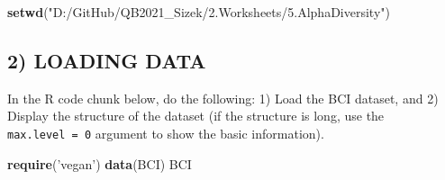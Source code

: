\documentclass[
]{article}
\newenvironment{Shaded}{\begin{snugshade}}{\end{snugshade}}
\newcommand{\KeywordTok}[1]{\textcolor[rgb]{0.13,0.29,0.53}{\textbf{#1}}}
\newcommand{\NormalTok}[1]{#1}
\newcommand{\StringTok}[1]{\textcolor[rgb]{0.31,0.60,0.02}{#1}}
\begin{document}
\begin{Shaded}
\begin{Highlighting}[]
\KeywordTok{setwd}\NormalTok{(}\StringTok{"D:/GitHub/QB2021_Sizek/2.Worksheets/5.AlphaDiversity"}\NormalTok{)}
\end{Highlighting}
\end{Shaded}

\hypertarget{loading-data}{%
\subsection{2) LOADING DATA}\label{loading-data}}

In the R code chunk below, do the following: 1) Load the BCI dataset,
and 2) Display the structure of the dataset (if the structure is long,
use the \texttt{max.level\ =\ 0} argument to show the basic
information).

\begin{Shaded}
\begin{Highlighting}[]
\KeywordTok{require}\NormalTok{(}\StringTok{'vegan'}\NormalTok{)}
\KeywordTok{data}\NormalTok{(BCI)}
\NormalTok{BCI}
\end{Highlighting}
\end{Shaded}
\end{document}
